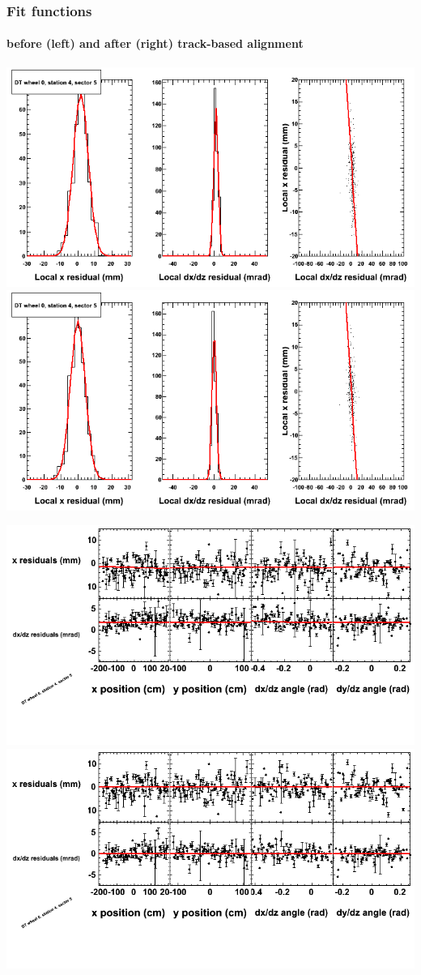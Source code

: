 \documentclass[compress]{beamer}
\begin{document}
\begin{frame}
\frametitle{Fit functions}
\framesubtitle{before (left) and after (right) track-based alignment}
\includegraphics[width=0.5\linewidth]{fitfunctions_re01/MBwhCst4sec05_bellcurves.png} \includegraphics[width=0.5\linewidth]{fitfunctions_re05/MBwhCst4sec05_bellcurves.png}

\includegraphics[width=0.5\linewidth]{fitfunctions_re01/MBwhCst4sec05_polynomials.png} \includegraphics[width=0.5\linewidth]{fitfunctions_re05/MBwhCst4sec05_polynomials.png}
\end{frame}
\end{document}

